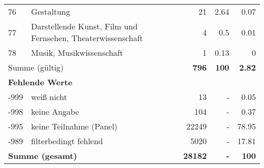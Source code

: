\begin{longtable}{lXrrr}
        76 & \multicolumn{1}{X}{Gestaltung} & %
          \num{21} &
          \num[round-mode=places,round-precision=2]{2,64} &
          \num[round-mode=places,round-precision=2]{0,07} \\

        77 & \multicolumn{1}{X}{Darstellende Kunst, Film und Fernsehen, Theaterwissenschaft} & %
          \num{4} &
          \num[round-mode=places,round-precision=2]{0,5} &
          \num[round-mode=places,round-precision=2]{0,01} \\

        78 & \multicolumn{1}{X}{Musik, Musikwissenschaft} & %
          \num{1} &
          \num[round-mode=places,round-precision=2]{0,13} &
          \num[round-mode=places,round-precision=2]{0} \\

     \midrule
     \multicolumn{2}{l}{Summe (gültig)} &
       \textbf{\num{796}} &
     \textbf{100} &
       \textbf{\num[round-mode=places,round-precision=2]{2,82}} \\
     \multicolumn{5}{l}{\textbf{Fehlende Werte}}\\
       -999 &
       weiß nicht &
         \num{13} &
        - &
         \num[round-mode=places,round-precision=2]{0,05} \\
       -998 &
       keine Angabe &
         \num{104} &
        - &
         \num[round-mode=places,round-precision=2]{0,37} \\
       -995 &
       keine Teilnahme (Panel) &
         \num{22249} &
        - &
         \num[round-mode=places,round-precision=2]{78,95} \\
       -989 &
       filterbedingt fehlend &
         \num{5020} &
        - &
         \num[round-mode=places,round-precision=2]{17,81} \\
     \midrule
     \multicolumn{2}{l}{\textbf{Summe (gesamt)}} &
          \textbf{\num{28182}} &
        \textbf{-} &
        \textbf{100} \\
     \bottomrule
     \end{longtable}
     
